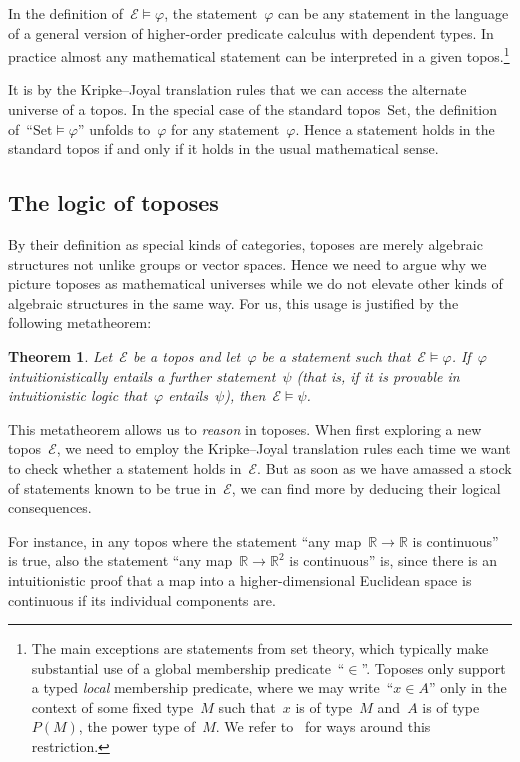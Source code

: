\documentclass[oneside,reqno]{amsart}
\theoremstyle{definition}
\theoremstyle{plain}
\newtheorem{thm}[defn]{Theorem}
\theoremstyle{remark}
\newcommand{\E}{\mathcal{E}}
\newcommand{\RR}{\mathbb{R}}
\newcommand{\Set}{\mathrm{Set}}
\renewcommand{\_}{\mathpunct{.}\,}
\newcommand{\?}{\,{:}\,}
\begin{document}
In the definition of~$\E \models \varphi$, the statement~$\varphi$ can be any
statement in the language of a general version of higher-order predicate
calculus with dependent types. In practice almost any mathematical statement
can be interpreted in a given topos.\footnote{The main exceptions are
statements from set theory, which typically make substantial use of a global
membership predicate~``$\in$''. Toposes only support a typed \emph{local}
membership predicate, where we may write~``$x \in A$'' only in the context of
some fixed type~$M$ such that~$x$ is of type~$M$ and~$A$ is of
type~$P(M)$, the power type of~$M$. We refer
to~\cite{fourman:sheaf-models,streicher:forcizf,awodey-butz-simpson-streicher:bist}
for ways around this restriction.}

It is by the Kripke--Joyal translation rules that we can access the alternate
universe of a topos. In the special case of the standard topos~$\Set$, the
definition of~``$\Set \models \varphi$'' unfolds to~$\varphi$ for any
statement~$\varphi$. Hence a statement holds in the standard topos if and only
if it holds in the usual mathematical sense.


\subsection{The logic of toposes} By their definition as special kinds of
categories, toposes are merely algebraic structures not unlike groups or vector
spaces. Hence we need to argue why we picture toposes as mathematical universes
while we do not elevate other kinds of algebraic structures in the same way.
For us, this usage is justified by the following metatheorem:

\begin{thm}\label{thm:reasoning}Let~$\E$ be a topos and let~$\varphi$ be a
statement such that~$\E \models \varphi$. If~$\varphi$ intuitionistically
entails a further statement~$\psi$ (that is, if it is provable in
intuitionistic logic that~$\varphi$ entails~$\psi$), then~$\E \models
\psi$.\end{thm}

This metatheorem allows us to \emph{reason} in toposes. When first exploring a
new topos~$\E$, we need to employ the Kripke--Joyal translation rules each time
we want to check whether a statement holds in~$\E$. But as soon as we
have amassed a stock of statements known to be true in~$\E$, we can find more
by deducing their logical consequences.

For instance, in any topos where the statement ``any map~$\RR \to \RR$ is
continuous'' is true, also the statement ``any map~$\RR \to \RR^2$ is
continuous'' is, since there is an intuitionistic proof that a map into a
higher-dimensional Euclidean space is continuous if its individual components
are.
\end{document}
